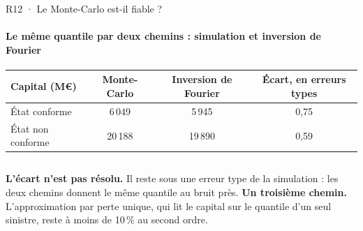 \documentclass[aspectratio=169,10pt,t]{beamer}
\renewcommand{\arraystretch}{1.25}
\begin{document}
\begin{frame}[label=reserve-fourier-resultat]{R12 · Le Monte-Carlo est-il fiable ?}
  \framesubtitle{Le même quantile par deux chemins : simulation et inversion de Fourier}
  \vspace{6mm}
  {\centering\small
  \renewcommand{\arraystretch}{1.3}
  \begin{tabular}{@{}lccc@{}}
    \toprule
    Capital (M€) & Monte-Carlo & Inversion de Fourier & Écart, en erreurs types \\
    \midrule
    État conforme & 6\,049 & 5\,945 & 0,75 \\
    \rowcolor{clair}État non conforme & 20\,188 & 19\,890 & 0,59 \\
    \bottomrule
  \end{tabular}\par}
  \vspace{6mm}
  \begin{columns}[T,onlytextwidth]
    \footnotesize
    \textbf{L'écart n'est pas résolu.} Il reste sous une erreur type de la simulation : les deux chemins donnent le même quantile au bruit près.
    \footnotesize
    \textbf{Un troisième chemin.} L'approximation par perte unique, qui lit le capital sur le quantile d'un seul sinistre, reste à moins de 10\,\% au second ordre.
  \end{columns}
\end{frame}
\end{document}
